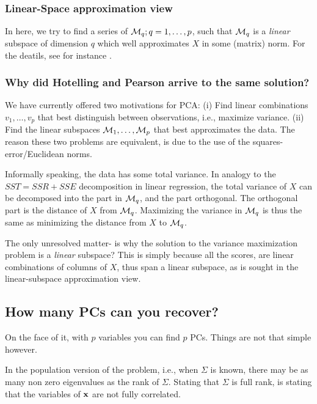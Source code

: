 \documentclass[12pt,a4paper]{article}
\begin{document}
\subsubsection{Linear-Space approximation view}

In here, we try to find a series of $\mathcal{M}_q; q=1,\dots,p$, such that $\mathcal{M}_q$ is a \emph{linear} subspace of dimension $q$ which well approximates $X$ in some (matrix) norm. 
For the deatils, see for instance \cite{shalev2014understanding}.




\subsubsection{Why did Hotelling and Pearson arrive to the same solution?}
\label{sec:pca_intuition}

We have currently offered two motivations for PCA: 
(i) Find linear combinations $v_1,\dots,v_p$ that best distinguish between observations, i.e., maximize variance. 
(ii) Find the linear subspaces $\mathcal{M}_1,\dots,\mathcal{M}_p$ that best approximates the data.
The reason these two problems are equivalent, is due to the use of the squares-error/Euclidean norms.

Informally speaking, the data has some total variance. 
In analogy to the $SST=SSR+SSE$ decomposition in linear regression, the total variance of $X$ can be decomposed into the part in $\mathcal{M}_q$, and the part orthogonal. 
The orthogonal part is the distance of $X$ from $\mathcal{M}_q$. 
Maximizing the variance in $\mathcal{M}_q$ is thus the same as minimizing the distance from $X$ to $\mathcal{M}_q$. 

The only unresolved matter- is why the solution to the variance maximization problem is a \emph{linear} subspace?
This is simply because all the scores, are linear combinations of columns of $X$, thus span a linear subspace, as is sought in the linear-subspace approximation view. 


\subsection{How many PCs can you recover?}
On the face of it, with $p$ variables you can find $p$ PCs. 
Things are not that simple however.

In the population version of the problem, i.e., when $\Sigma$ is known, there may be as many non zero eigenvalues as the rank of $\Sigma$. 
Stating that $\Sigma$ is full rank, is stating that the variables of $\mathbf{x}$ are not fully correlated.
\end{document}
